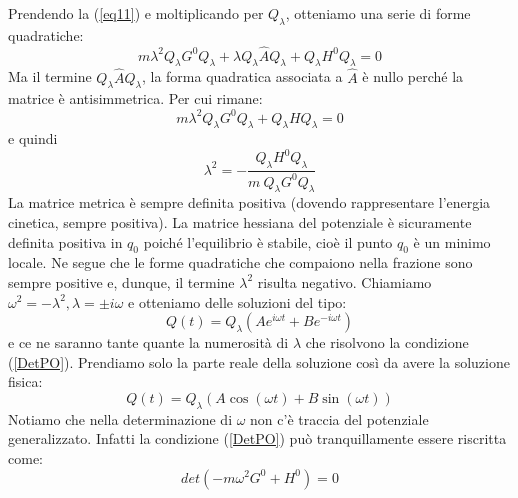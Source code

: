 \documentclass[a4paper,openany]{article}
\begin{document}
	Prendendo la (\ref{eq11}) e moltiplicando per $Q_{\lambda}$, otteniamo una serie di forme quadratiche:
	$$
	m\lambda^{2}Q_{\lambda}G^{0}Q_{\lambda} + \lambda Q_{\lambda}\hat{A}Q_{\lambda} + Q_{\lambda}H^{0}Q_{\lambda} = 0
	$$
	Ma il termine $Q_{\lambda}\hat{A}Q_{\lambda}$, la forma quadratica associata a $\hat{A}$ è nullo perché la matrice è antisimmetrica. Per cui rimane:
	$$
	m\lambda^{2}Q_{\lambda}G^{0}Q_{\lambda} + Q_{\lambda}HQ_{\lambda} = 0
	$$
	e quindi
	\begin{equation}\label{key}
		\lambda^{2} = -\dfrac{Q_{\lambda}H^{0}Q_{\lambda}}{m \> Q_{\lambda}G^{0}Q_{\lambda}}
	\end{equation}
	La matrice metrica è sempre definita positiva (dovendo rappresentare l'energia cinetica, sempre positiva). La matrice hessiana del potenziale è sicuramente definita positiva in $q_0$ poiché l'equilibrio è stabile, cioè il punto $q_0$ è un minimo locale. Ne segue che le forme quadratiche che compaiono nella frazione sono sempre positive e, dunque, il termine $\lambda^{2}$ risulta negativo. Chiamiamo $\omega^{2}=-\lambda^{2}, \lambda = \pm i \omega$ e otteniamo delle soluzioni del tipo:
	\begin{equation}\label{key}
		Q(t) = Q_{\lambda} (Ae^{i\omega t}+Be^{-i\omega t})
	\end{equation}
	e ce ne saranno tante quante la numerosità di $\lambda$ che risolvono la condizione (\ref{DetPO}). Prendiamo solo la parte reale della soluzione così da avere la soluzione fisica:
	\begin{equation}\label{key}
		Q(t) = Q_{\lambda} (A\cos(\omega t)+B\sin(\omega t))
	\end{equation}
	Notiamo che nella determinazione di $\omega$ non c'è traccia del potenziale generalizzato. Infatti la condizione (\ref{DetPO}) può tranquillamente essere riscritta come:
	\begin{equation}
		det(-m\omega^{2}G^{0} + H^{0}) = 0
		\label{DetPO}
	\end{equation}
	
	
	
\end{document}
